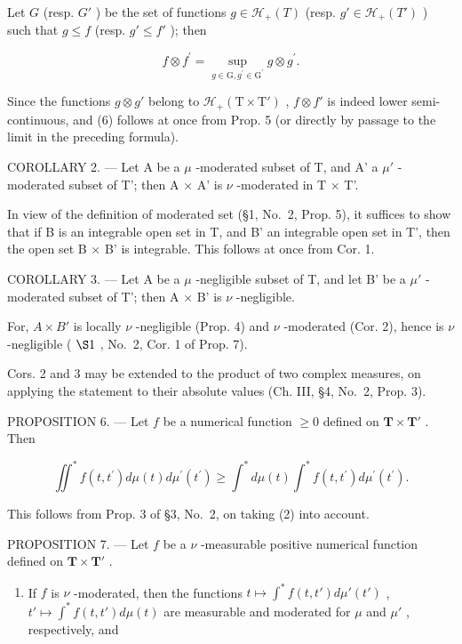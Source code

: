 Let \(G\) (resp. \(G'\) ) be the set of functions \(g \in \mathcal{H}_{+}(T)\) (resp. \(g' \in \mathcal{H}_{+}(T')\) ) such that \(g \leqslant f\) (resp. \(g' \leqslant f'\) ); then

\[
f \otimes f ^ {\prime} = \sup _ {g \in \mathrm{G}, g ^ {\prime} \in \mathrm{G} ^ {\prime}} g \otimes g ^ {\prime}.
\]

Since the functions \(g \otimes g'\) belong to \(\mathcal{H}_{+}(\mathrm{T} \times \mathrm{T}')\) , \(f \otimes f'\) is indeed lower semi-continuous, and (6) follows at once from Prop. 5 (or directly by passage to the limit in the preceding formula).

COROLLARY 2. --- Let A be a \(\mu\) -moderated subset of T, and A' a \(\mu'\) -moderated subset of T'; then A × A' is \(\nu\) -moderated in T × T'.

In view of the definition of moderated set (§1, No.~2, Prop. 5), it suffices to show that if B is an integrable open set in T, and B' an integrable open set in T', then the open set B × B' is integrable. This follows at once from Cor. 1.

COROLLARY 3. --- Let A be a \(\mu\) -negligible subset of T, and let B' be a \(\mu'\) -moderated subset of T'; then A × B' is \(\nu\) -negligible.

For, \(A \times B'\) is locally \(\nu\) -negligible (Prop. 4) and \(\nu\) -moderated (Cor. 2), hence is \(\nu\) -negligible ( \(\S1\) , No.~2, Cor. 1 of Prop. 7).

Cors. 2 and 3 may be extended to the product of two complex measures, on applying the statement to their absolute values (Ch. III, §4, No.~2, Prop. 3).

PROPOSITION 6. --- Let \(f\) be a numerical function \(\geqslant 0\) defined on \(\mathbf{T} \times \mathbf{T}'\) . Then

\[
\iint^ {*} f (t, t ^ {\prime}) d \mu (t) d \mu^ {\prime} (t ^ {\prime}) \geqslant \int^ {*} d \mu (t) \int^ {*} f (t, t ^ {\prime}) d \mu^ {\prime} (t ^ {\prime}).
\]

This follows from Prop. 3 of §3, No.~2, on taking (2) into account.

PROPOSITION 7. --- Let \(f\) be a \(\nu\) -measurable positive numerical function defined on \(\mathbf{T} \times \mathbf{T}'\) .

\begin{enumerate}
\def\labelenumi{\alph{enumi})}
\tightlist
\item
  If \(f\) is \(\nu\) -moderated, then the functions \(t \mapsto \int^{*} f(t, t') d\mu'(t')\) , \(t' \mapsto \int^{*} f(t, t') d\mu(t)\) are measurable and moderated for \(\mu\) and \(\mu'\) , respectively, and
\end{enumerate}

